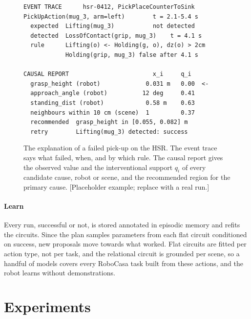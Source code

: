 \documentclass[letterpaper, 10 pt, conference]{ieeeconf}
\newcommand{\dummystyle}{\color{dummy}}
\newcommand{\dummystyle}{}
\newcommand{\dummynote}[1]{{\dummystyle[#1]}}
\newcommand{\dummynote}[1]{}
\newcommand{\robocasa}{RoboCasa}
\begin{document}
\newsavebox{\explanationbox}
\begin{figure}[t]
  \centering
  \begin{lrbox}{\explanationbox}
  \begin{minipage}{0.95\columnwidth}
  \scriptsize
\begin{verbatim}
EVENT TRACE      hsr-0412, PickPlaceCounterToSink
PickUpAction(mug_3, arm=left)        t = 2.1-5.4 s
  expected  Lifting(mug_3)           not detected
  detected  LossOfContact(grip, mug_3)    t = 4.1 s
  rule      Lifting(o) <- Holding(g, o), dz(o) > 2cm
            Holding(grip, mug_3) false after 4.1 s

CAUSAL REPORT                        x_i     q_i
  grasp_height (robot)             0.031 m   0.00  <-
  approach_angle (robot)          12 deg     0.41
  standing_dist (robot)            0.58 m    0.63
  neighbours within 10 cm (scene)  1         0.37
  recommended  grasp_height in [0.055, 0.082] m
  retry        Lifting(mug_3) detected: success
\end{verbatim}
  \end{minipage}
  \end{lrbox}
  \fbox{\usebox{\explanationbox}}
  \caption{The explanation of a failed pick-up on the HSR. The event trace says
  what failed, when, and by which rule. The causal report gives the observed
  value and the interventional support $q_i$ of every candidate cause, robot or
  scene, and the recommended region for the primary cause.
  \dummynote{Placeholder example; replace with a real run.}}
  \label{fig:explanation}
\end{figure}

\paragraph*{Learn}
Every run, successful or not, is stored annotated in episodic memory and
refits the circuits. Since the plan samples parameters from each flat circuit
conditioned on success, new proposals move towards what worked. Flat circuits
are fitted per action type, not per task, and the relational circuit is
grounded per scene, so a handful of models covers every \robocasa{} task built
from these actions, and the robot learns without demonstrations.

\section{Experiments}
\label{sec:experiments}
\end{document}
